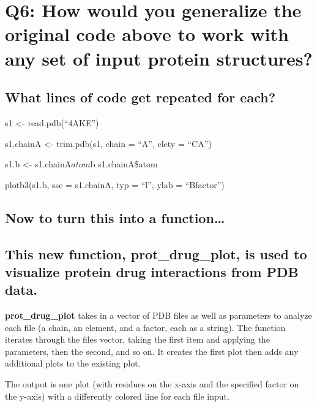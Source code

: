\documentclass[]{article}
\begin{document}
\section{\texorpdfstring{\textbf{Q6: How would you generalize the
original code above to work with any set of input protein
structures?}}{Q6: How would you generalize the original code above to work with any set of input protein structures?}}\label{q6-how-would-you-generalize-the-original-code-above-to-work-with-any-set-of-input-protein-structures}

\subsection{What lines of code get repeated for
each?}\label{what-lines-of-code-get-repeated-for-each}

s1 \textless{}- read.pdb(``4AKE'')

s1.chainA \textless{}- trim.pdb(s1, chain = ``A'', elety = ``CA'')

s1.b \textless{}- s1.chainA\(atom\)b s1.chainA\$atom

plotb3(s1.b, sse = s1.chainA, typ = ``l'', ylab = ``Bfactor'')

\subsection{Now to turn this into a
function\ldots{}}\label{now-to-turn-this-into-a-function}

\subsection{\texorpdfstring{This new function,
\textbf{prot\_drug\_plot}, is used to visualize protein drug
interactions from PDB
data.}{This new function, prot\_drug\_plot, is used to visualize protein drug interactions from PDB data.}}\label{this-new-function-prot_drug_plot-is-used-to-visualize-protein-drug-interactions-from-pdb-data.}

\textbf{prot\_drug\_plot} takes in a vector of PDB files as well as
parameters to analyze each file (a chain, an element, and a factor, each
as a string). The function iterates through the files vector, taking the
first item and applying the parameters, then the second, and so on. It
creates the first plot then adds any additional plots to the existing
plot.

The output is one plot (with residues on the x-axis and the specified
factor on the y-axis) with a differently colored line for each file
input.
\end{document}
